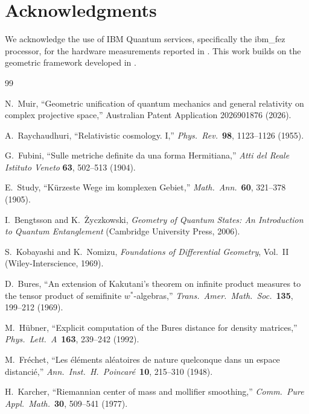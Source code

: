 \documentclass[12pt,a4paper]{article}
\begin{document}
\section*{Acknowledgments}

We acknowledge the use of IBM Quantum services, specifically the ibm\_fez processor, for the hardware measurements reported in \cite{muir2026}. This work builds on the geometric framework developed in \cite{muir2026}.

\begin{thebibliography}{99}

N.~Muir, ``Geometric unification of quantum mechanics and general relativity on complex projective space,''
Australian Patent Application 2026901876 (2026).

A.~Raychaudhuri, ``Relativistic cosmology. I,''
\textit{Phys.\ Rev.}\ \textbf{98}, 1123--1126 (1955).

G.~Fubini, ``Sulle metriche definite da una forma Hermitiana,''
\textit{Atti del Reale Istituto Veneto} \textbf{63}, 502--513 (1904).

E.~Study, ``K\"urzeste Wege im komplexen Gebiet,''
\textit{Math.\ Ann.}\ \textbf{60}, 321--378 (1905).

I.~Bengtsson and K.~\.Zyczkowski, \textit{Geometry of Quantum States: An Introduction to Quantum Entanglement}
(Cambridge University Press, 2006).

S.~Kobayashi and K.~Nomizu, \textit{Foundations of Differential Geometry}, Vol.~II
(Wiley-Interscience, 1969).

D.~Bures, ``An extension of Kakutani's theorem on infinite product measures to the tensor product of semifinite $w^*$-algebras,''
\textit{Trans.\ Amer.\ Math.\ Soc.}\ \textbf{135}, 199--212 (1969).

M.~H\"ubner, ``Explicit computation of the Bures distance for density matrices,''
\textit{Phys.\ Lett.\ A}\ \textbf{163}, 239--242 (1992).

M.~Fr\'echet, ``Les \'el\'ements al\'eatoires de nature quelconque dans un espace distanci\'e,''
\textit{Ann.\ Inst.\ H.\ Poincar\'e}\ \textbf{10}, 215--310 (1948).

H.~Karcher, ``Riemannian center of mass and mollifier smoothing,''
\textit{Comm.\ Pure Appl.\ Math.}\ \textbf{30}, 509--541 (1977).


\end{thebibliography}
\end{document}
